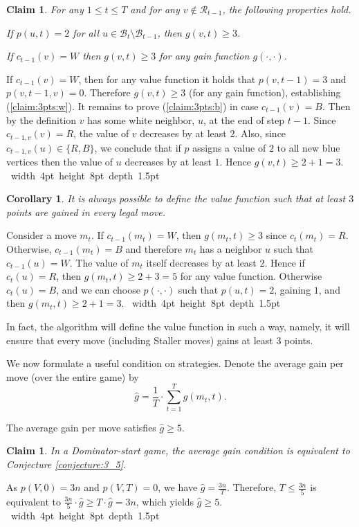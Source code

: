 \documentclass[11pt]{article}
\def\Proof{\par\noindent{\bf Proof:~}}
\def\blackslug{\hbox{\hskip 1pt \vrule width 4pt height 8pt
    depth 1.5pt \hskip 1pt}}
\def\QED{\quad\blackslug\lower 8.5pt\null\par}
\def\dnsitem{\vspace{-7pt}\item}
\newtheorem{claim}[theorem]{Claim}
\newtheorem{corollary}[theorem]{Corollary}
\theoremstyle{definition}
\begin{document}
\begin{claim}
\label{claim:3pts}
For any $1 \leq t \leq T$ and for any $v \notin \mathcal{R}_{t-1}$, the following properties hold.
\begin{enumerate}[(a)]
{\setlength\itemindent{10pt} 
	\dnsitem 
	\label{claim:3pts:b}
	If $p(u, t) = 2$ for all $u \in \mathcal{B}_t \setminus \mathcal{B}_{t-1}$, then $g(v, t) \geq 3$.
	
	\dnsitem 
	\label{claim:3pts:w}
	If $c_{t-1}(v) = W$ then $g(v, t) \geq 3$ for any gain function $g(\cdot, \cdot)$.
}
\end{enumerate}
\end{claim}
\Proof
If $c_{t-1}(v)=W$, then for any value function it holds that $p(v, t-1) = 3$ and $p\left(v, t-1, v\right) = 0$. 
Therefore $g(v, t) \geq 3$ (for any gain function), establishing (\ref{claim:3pts:w}).
It remains to prove (\ref{claim:3pts:b}) in case $c_{t-1}(v)=B$. Then by the definition $v$ has some white neighbor, $u$, at the end of step $t-1$. 
Since $c_{t-1,v}(v) = R$, the value of $v$ decreases by at least $2$. 
Also, since $c_{t-1,v}(u) \in \{R,B\}$, we conclude that if $p$ assigns a value of $2$ to all new blue vertices then the value of $u$ decreases by at least $1$. 
Hence $g(v, t) \geq 2 + 1 = 3$.
\QED

\begin{corollary}
\label{cor:3pts_def}
It is always possible to define the value function such that at least $3$ points are gained in every legal move.
\end{corollary}
\Proof
Consider a move $m_t$. If $c_{t-1}(m_t) = W$, then $g(m_t, t) \geq 3$ since $c_t(m_t) = R$.
Otherwise, ${c_{t-1}(m_t) = B}$ and therefore $m_t$ has a neighbor $u$ such that $c_{t-1}(u) = W$.
The value of $m_t$ itself decreases by at least $2$. Hence if $c_t(u) = R$, then $g(m_t, t) \geq 2+3 = 5$ for any value function.
Otherwise $c_t(u) = B$, and we can choose $p(\cdot, \cdot)$ such that $p(u, t) = 2$, gaining $1$, and then ${g(m_t, t) \geq 2 + 1 = 3}$.
\QED
In fact, the algorithm will define the value function in such a way, namely, it will ensure that every move (including Staller moves) gains at least $3$ points.

We now formulate a useful condition on strategies. 
Denote the average gain per move (over the entire game) by
$$\hat{g} = \frac{1}{T} \cdot \sum_{t=1}^{T}g(m_t, t). $$
\smallskip
\par{}
The average gain per move satisfies $\hat{g}\ge 5$.
\begin{claim}
\label{claim:avg_5}
In a Dominator-start game, the average gain condition is equivalent to Conjecture \ref{conjecture:3_5}.
\end{claim}
\Proof
As $p(V, 0) = 3n$ and $p(V, T)=0$, we have $\hat{g} = \frac{3n}{T}$. 
Therefore, $T \leq \frac{3n}{5}$ is equivalent to 
$\frac{3n}{5} \cdot \hat{g} \geq T \cdot \hat{g} = 3n$,
 which yields $\hat{g} \geq 5$.
\QED
\end{document}
